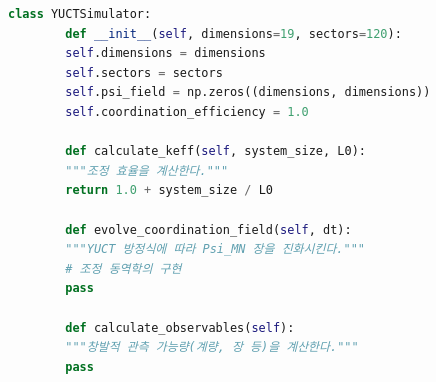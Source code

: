 \documentclass[11pt,a4paper]{article}
\theoremstyle{remark}
\begin{document}
	\begin{lstlisting}[language=Python, caption={YUCT 시뮬레이션 프레임워크}, label={lst:simulation}]
		class YUCTSimulator:
		def __init__(self, dimensions=19, sectors=120):
		self.dimensions = dimensions
		self.sectors = sectors
		self.psi_field = np.zeros((dimensions, dimensions))
		self.coordination_efficiency = 1.0
		
		def calculate_keff(self, system_size, L0):
		"""조정 효율을 계산한다."""
		return 1.0 + system_size / L0
		
		def evolve_coordination_field(self, dt):
		"""YUCT 방정식에 따라 Psi_MN 장을 진화시킨다."""
		# 조정 동역학의 구현
		pass
		
		def calculate_observables(self):
		"""창발적 관측 가능량(계량, 장 등)을 계산한다."""
		pass
	\end{lstlisting}
	
\end{document}
